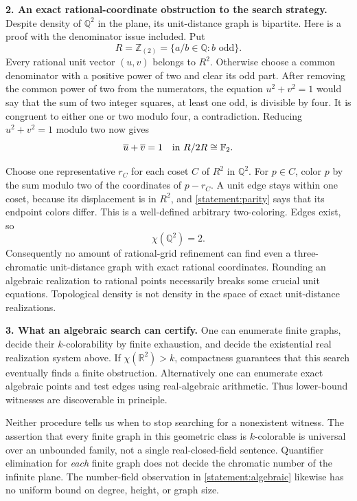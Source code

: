 \documentclass[11pt,a4paper]{article}
\newcommand{\Z}{\mathbb{Z}}
\newcommand{\Q}{\mathbb{Q}}
\newcommand{\R}{\mathbb{R}}
\newcommand{\F}{\mathbb{F}}
\numberwithin{equation}{section}
\begin{document}
\textbf{2. An exact rational-coordinate obstruction to the search strategy.}
Despite density of $\Q^2$ in the plane, its unit-distance graph is
bipartite. Here is a proof with the denominator issue included. Put
\[
 R=\Z_{(2)}=\{a/b\in\Q:b\text{ odd}\}.
\]
Every rational unit vector $(u,v)$ belongs to $R^2$. Otherwise choose a
common denominator with a positive power of two and clear its odd part.
After removing the common power of two from the numerators, the equation
$u^2+v^2=1$ would say that the sum of two integer squares, at least one
odd, is divisible by four. It is congruent to either one or two modulo
four, a contradiction. Reducing $u^2+v^2=1$ modulo two now gives
\begin{equation}\label{statement:parity}
 \overline u+\overline v=1\quad\hbox{in }R/2R\cong\F_2.
\end{equation}

Choose one representative $r_C$ for each coset $C$ of $R^2$ in $\Q^2$.
For $p\in C$, color $p$ by the sum modulo two of the coordinates of
$p-r_C$. A unit edge stays within one coset, because its displacement is
in $R^2$, and \eqref{statement:parity} says that its endpoint colors differ.
This is a well-defined arbitrary two-coloring. Edges exist, so
\[
 \chi(\Q^2)=2.
\]
Consequently no amount of rational-grid refinement can find even a
three-chromatic unit-distance graph with exact rational coordinates.
Rounding an algebraic realization to rational points necessarily breaks
some crucial unit equations. Topological density is not density in the
space of exact unit-distance realizations.

\textbf{3. What an algebraic search can certify.}
One can enumerate finite graphs, decide their $k$-colorability by finite
exhaustion, and decide the existential real realization system above.
If $\chi(\R^2)>k$, compactness guarantees that this search eventually
finds a finite obstruction. Alternatively one can enumerate exact
algebraic points and test edges using real-algebraic arithmetic. Thus
lower-bound witnesses are discoverable in principle.

Neither procedure tells us when to stop searching for a nonexistent
witness. The assertion that every finite graph in this geometric class
is $k$-colorable is universal over an unbounded family, not a single
real-closed-field sentence. Quantifier elimination for \emph{each}
finite graph does not decide the chromatic number of the infinite plane.
The number-field observation in \eqref{statement:algebraic} likewise has no
uniform bound on degree, height, or graph size.
\end{document}
